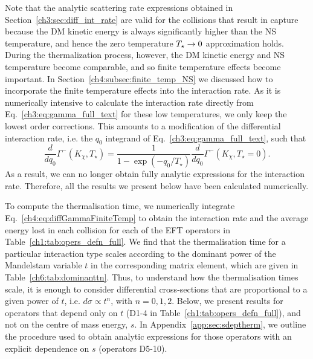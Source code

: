 Note that the analytic scattering rate expressions obtained in Section~\ref{ch3:sec:diff_int_rate} are valid for the collisions that result in capture because the DM kinetic energy is always significantly higher than the NS temperature, and hence the zero temperature $T_\star\rightarrow0$ approximation holds. 
During the thermalization process, however, the DM kinetic energy and NS temperature become comparable, and so finite temperature effects become important. 
In Section~\ref{ch4:subsec:finite_temp_NS} we discussed how to incorporate the finite temperature effects into the interaction rate. As it is numerically intensive to calculate the interaction rate directly from Eq.~\ref{ch3:eq:gamma_full_text} for these low temperatures, we only keep the lowest order corrections.
This amounts to a modification of the differential interaction rate, i.e. the $q_0$ integrand of Eq.~\ref{ch3:eq:gamma_full_text}, such that
\begin{equation}
    \frac{d }{d q_0}\Gamma^-(K_\chi, T_\star) = \frac{1}{1 - \exp(-q_0/T_\star)} \frac{d }{d q_0}\Gamma^-(K_\chi, T_\star = 0).
    \label{ch4:eq:diffGammaFiniteTemp}
\end{equation}
As a result, we can no longer obtain fully analytic expressions for the interaction rate. Therefore, all the results we present below have been calculated numerically. 

To compute the thermalisation time, we numerically integrate Eq.~\ref{ch4:eq:diffGammaFiniteTemp} to obtain the interaction rate and the average energy lost in each collision for each of the EFT operators in Table~\ref{ch1:tab:opers_defn_full}. We find that the thermalisation time for a particular interaction type scales according to the dominant power of the Mandelstam variable $t$ in the corresponding matrix element, which are given in Table~\ref{ch6:tab:dominanttn}. Thus, to understand how the thermalisation times scale, it is enough to consider differential cross-sections that are proportional to a given power of $t$, i.e. $d\sigma\propto t^n$, with $n=0,1,2$. 
Below, we present results for operators that depend only on $t$ (D1-4 in Table~\ref{ch1:tab:opers_defn_full}), and not on the centre of mass energy, $s$. In Appendix~\ref{app:sec:sdeptherm}, we outline the procedure used to obtain analytic expressions for those operators with an explicit dependence on $s$ (operators D5-10). 

